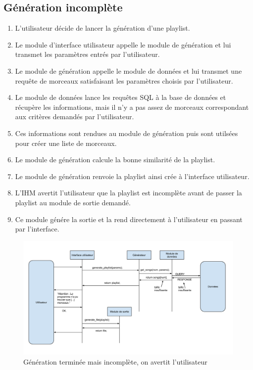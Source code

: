 \subsection{Génération incomplète}
\label{scenarii:gen:incomp}

\begin{enumerate}
\item L'utilisateur décide de lancer la génération d'une playlist.
\item Le module d'interface utilisateur appelle le module de génération et 
lui transmet les paramètres entrés par l'utilisateur.
\item Le module de génération appelle le module de données et lui transmet 
une requête de morceaux satisfaisant les paramètres choisis par l'utilisateur.
\item Le module de données lance les requêtes SQL à la base de données et
récupère les informations, mais il n'y a pas assez de morceaux correspondant 
aux critères demandés par l'utilisateur.
\item Ces informations sont rendues au module de génération puis sont 
utilsées pour créer une liste de morceaux.
\item Le module de génération calcule la bonne similarité de la playlist.
\item Le module de génération renvoie la playlist ainsi crée à l'interface 
utilisateur.
\item L'IHM avertit l'utilisateur que la playlist est incomplète avant de 
passer la playlist au module de sortie demandé.
\item Ce module génére la sortie et la rend directement à l'utilisateur en 
passant par l'interface.
\end{enumerate}

\begin{figure}[!h]
\includegraphics[width=14cm]{data/generation_incomplete.png}
\caption{Génération terminée mais incomplète, on avertit l'utilisateur}
\end{figure}
 

